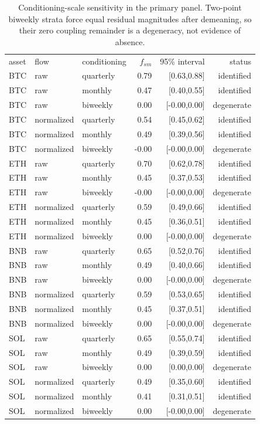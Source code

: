 \begin{table}[!htbp]
\caption{Conditioning-scale sensitivity in the primary panel. Two-point biweekly strata force equal residual magnitudes after demeaning, so their zero coupling remainder is a degeneracy, not evidence of absence.}
\label{tab:conditioning-sensitivity}
\begin{ruledtabular}
\begin{tabular}{lllrrr}
asset & flow & conditioning & $f_{sm}$ & 95\% interval & status \\
\colrule
BTC & raw & quarterly & 0.79 & [0.63,0.88] & identified \\
BTC & raw & monthly & 0.47 & [0.40,0.55] & identified \\
BTC & raw & biweekly & 0.00 & [-0.00,0.00] & degenerate \\
BTC & normalized & quarterly & 0.54 & [0.45,0.62] & identified \\
BTC & normalized & monthly & 0.49 & [0.39,0.56] & identified \\
BTC & normalized & biweekly & -0.00 & [-0.00,0.00] & degenerate \\
ETH & raw & quarterly & 0.70 & [0.62,0.78] & identified \\
ETH & raw & monthly & 0.45 & [0.37,0.53] & identified \\
ETH & raw & biweekly & -0.00 & [-0.00,0.00] & degenerate \\
ETH & normalized & quarterly & 0.59 & [0.49,0.66] & identified \\
ETH & normalized & monthly & 0.45 & [0.36,0.51] & identified \\
ETH & normalized & biweekly & 0.00 & [-0.00,0.00] & degenerate \\
BNB & raw & quarterly & 0.65 & [0.52,0.76] & identified \\
BNB & raw & monthly & 0.49 & [0.40,0.66] & identified \\
BNB & raw & biweekly & 0.00 & [-0.00,0.00] & degenerate \\
BNB & normalized & quarterly & 0.59 & [0.53,0.65] & identified \\
BNB & normalized & monthly & 0.45 & [0.37,0.51] & identified \\
BNB & normalized & biweekly & 0.00 & [-0.00,0.00] & degenerate \\
SOL & raw & quarterly & 0.65 & [0.55,0.74] & identified \\
SOL & raw & monthly & 0.49 & [0.39,0.59] & identified \\
SOL & raw & biweekly & 0.00 & [0.00,0.00] & degenerate \\
SOL & normalized & quarterly & 0.49 & [0.35,0.60] & identified \\
SOL & normalized & monthly & 0.41 & [0.31,0.51] & identified \\
SOL & normalized & biweekly & 0.00 & [-0.00,0.00] & degenerate \\
\end{tabular}
\end{ruledtabular}
\end{table}

